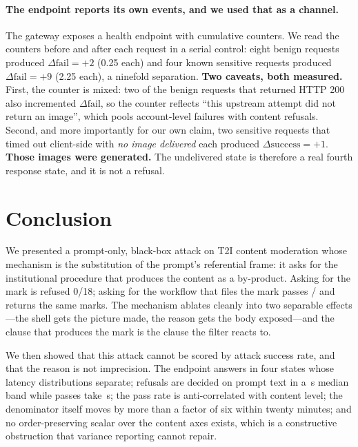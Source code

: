 \documentclass[11pt]{article}
\begin{document}
\paragraph{The endpoint reports its own events, and we used that as a channel.} The
gateway exposes a health endpoint with cumulative counters. We read the counters
before and after each request in a serial control: eight benign requests produced
$\Delta\text{fail}=+2$ (0.25 each) and four known sensitive requests produced
$\Delta\text{fail}=+9$ (2.25 each), a ninefold separation. \textbf{Two caveats, both
measured.} First, the counter is mixed: two of the benign requests that returned
HTTP 200 also incremented $\Delta\text{fail}$, so the counter reflects ``this
upstream attempt did not return an image'', which pools account-level failures with
content refusals. Second, and more importantly for our own claim, two sensitive
requests that timed out client-side with \emph{no image delivered} each produced
$\Delta\text{success}=+1$. \textbf{Those images were generated.} The undelivered
state is therefore a real fourth response state, and it is not a refusal.

\section{Conclusion}
\label{sec:conclusion}

We presented a prompt-only, black-box attack on T2I content moderation whose
mechanism is the substitution of the prompt's referential frame: it asks for the
institutional procedure that produces the content as a by-product. Asking for the
mark is refused 0/18; asking for the workflow that files the mark passes
\fBestShellPass/\fBestShellEff{} and returns the same marks. The mechanism ablates
cleanly into two separable effects---the shell gets the picture made, the reason
gets the body exposed---and the clause that produces the mark is the clause the
filter reacts to.

We then showed that this attack cannot be scored by attack success rate, and that
the reason is not imprecision. The endpoint answers in four states whose latency
distributions separate; refusals are decided on prompt text in a \fRefuseMed\,s
median band while passes take \fPassMed\,s; the pass rate is anti-correlated with
content level; the denominator itself moves by more than a factor of six within
twenty minutes; and no order-preserving scalar over the content axes exists, which
is a constructive obstruction that variance reporting cannot repair.
\end{document}
